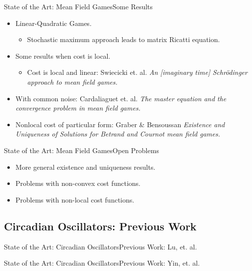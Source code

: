 \documentclass{beamer}
\begin{document}
\begin{frame}{State of the Art: Mean Field Games}{Some Results}
	\begin{itemize}
		\item {
			Linear-Quadratic Games.
		}
		\begin{itemize}
			\item Stochastic maximum approach leads to matrix Ricatti equation.
		\end{itemize}
		\item Some results when cost is local.
		\begin{itemize}
			\item Cost is local and linear: Swiecicki et. al. \textit{An [imaginary time] Schr{\"o}dinger approach to mean field games.}
		\end{itemize}
		\item With common noise: Cardaliaguet et. al. \textit{The master equation and the convergence problem in mean field games.}
		\item Nonlocal cost of particular form: Graber \& Bensoussan \textit{Existence and Uniqueness of Solutions for Betrand and Cournot mean field games.}
	\end{itemize}
\end{frame}

\begin{frame}{State of the Art: Mean Field Games}{Open Problems}
	\begin{itemize}
		\item {
			More general existence and uniqueness results.
		}
		\item {
			Problems with non-convex cost functions.
		}
		\item {
			Problems with non-local cost functions.
		}
	\end{itemize}
\end{frame}

\subsection{Circadian Oscillators: Previous Work}

\begin{frame}{State of the Art: Circadian Oscillators}{Previous Work: Lu, et. al.}
\end{frame}

\begin{frame}{State of the Art: Circadian Oscillators}{Previous Work: Yin, et. al.}
\end{frame}
\end{document}
